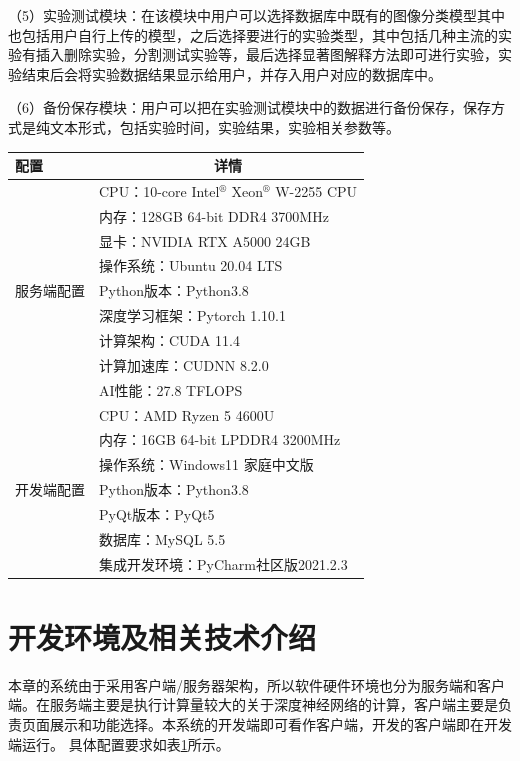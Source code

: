  （5）实验测试模块：在该模块中用户可以选择数据库中既有的图像分类模型其中也包括用户自行上传的模型，之后选择要进行的实验类型，其中包括几种主流的实验有插入删除实验，分割测试实验等，最后选择显著图解释方法即可进行实验，实验结束后会将实验数据结果显示给用户，并存入用户对应的数据库中。
 
 （6）备份保存模块：用户可以把在实验测试模块中的数据进行备份保存，保存方式是纯文本形式，包括实验时间，实验结果，实验相关参数等。

\begin{table}
	\renewcommand{\arraystretch}{1.5}
	\centering
	\label{tab:sys}
	\begin{tabular}{p{4cm}p{8cm}} 
		\hline
		配置                     & \multicolumn{1}{c}{详情}             \\ 
		\hline
		\multirow{9}{*}{服务端配置} & CPU：10-core Intel$^\circledR$ Xeon$^\circledR$ W-2255 CPU  \\
		& 内存：128GB 64-bit DDR4 3700MHz       \\
		& 显卡：NVIDIA RTX A5000 24GB           \\
		& 操作系统：Ubuntu 20.04 LTS              \\
		& Python版本：Python3.8                 \\
		& 深度学习框架：Pytorch 1.10.1              \\
		& 计算架构：CUDA 11.4                     \\
		& 计算加速库：CUDNN 8.2.0                  \\
		& AI性能：27.8 TFLOPS                   \\ 
		\hline
		\multirow{7}{*}{开发端配置} & CPU：AMD Ryzen 5 4600U              \\
		& 内存：16GB 64-bit LPDDR4 3200MHz      \\
		& 操作系统：Windows11 家庭中文版               \\
		& Python版本：Python3.8                 \\
		& PyQt版本：PyQt5                       \\
		& 数据库：MySQL 5.5                      \\
		& 集成开发环境：PyCharm社区版2021.2.3            \\
		\hline
	\end{tabular}
\end{table}

 
\section{开发环境及相关技术介绍}
本章的系统由于采用客户端/服务器架构，所以软件硬件环境也分为服务端和客户端。在服务端主要是执行计算量较大的关于深度神经网络的计算，客户端主要是负责页面展示和功能选择。本系统的开发端即可看作客户端，开发的客户端即在开发端运行。  具体配置要求如表\ref{tab:sys}所示。



